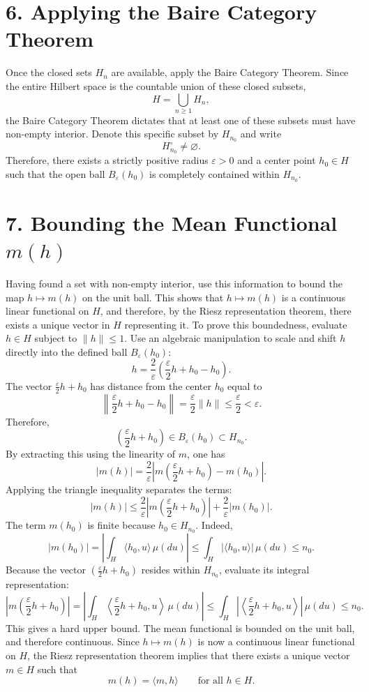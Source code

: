 \documentclass[11pt]{article}
\theoremstyle{definition}
\theoremstyle{remark}
\begin{document}
\section*{6. Applying the Baire Category Theorem}
Once the closed sets $H_n$ are available, apply the Baire Category Theorem. Since the entire Hilbert space is the countable union of these closed subsets,
\[
H=\bigcup_{n\ge 1} H_n,
\]
the Baire Category Theorem dictates that at least one of these subsets must have non-empty interior. Denote this specific subset by $H_{n_0}$ and write
\[
H^\circ_{n_0}\neq\varnothing.
\]
Therefore, there exists a strictly positive radius $\varepsilon>0$ and a center point $h_0\in H$ such that the open ball $B_\varepsilon(h_0)$ is completely contained within $H_{n_0}$.

\section*{7. Bounding the Mean Functional $m(h)$}
Having found a set with non-empty interior, use this information to bound the map $h\mapsto m(h)$ on the unit ball. This shows that $h\mapsto m(h)$ is a continuous linear functional on $H$, and therefore, by the Riesz representation theorem, there exists a unique vector in $H$ representing it. To prove this boundedness, evaluate $h\in H$ subject to $\|h\|\le 1$. Use an algebraic manipulation to scale and shift $h$ directly into the defined ball $B_\varepsilon(h_0)$:
\[
h=\frac{2}{\varepsilon}\left(\frac{\varepsilon}{2}h+h_0-h_0\right).
\]
The vector \(\frac{\varepsilon}{2}h+h_0\) has distance from the center \(h_0\) equal to
\[
\left\|\frac{\varepsilon}{2}h+h_0-h_0\right\|=\frac{\varepsilon}{2}\|h\|\le \frac{\varepsilon}{2}<\varepsilon.
\]
Therefore,
\[
\left(\frac{\varepsilon}{2}h+h_0\right)\in B_\varepsilon(h_0)\subset H_{n_0}.
\]
By extracting this using the linearity of $m$, one has
\[
|m(h)|=\frac{2}{\varepsilon}\left|m\left(\frac{\varepsilon}{2}h+h_0\right)-m(h_0)\right|.
\]
Applying the triangle inequality separates the terms:
\[
|m(h)|\le \frac{2}{\varepsilon}\left|m\left(\frac{\varepsilon}{2}h+h_0\right)\right|+\frac{2}{\varepsilon}|m(h_0)|.
\]
The term \(m(h_0)\) is finite because \(h_0\in H_{n_0}\). Indeed,
\[
|m(h_0)|
=
\left|\int_H \langle h_0,u\rangle\,\mu(du)\right|
\le
\int_H |\langle h_0,u\rangle|\,\mu(du)
\le n_0.
\]
Because the vector \(\left(\frac{\varepsilon}{2}h+h_0\right)\) resides within $H_{n_0}$, evaluate its integral representation:
\[
\left|m\left(\frac{\varepsilon}{2}h+h_0\right)\right|
=
\left|\int_H \left\langle \frac{\varepsilon}{2}h+h_0,u\right\rangle\,\mu(du)\right|
\le
\int_H \left|\left\langle \frac{\varepsilon}{2}h+h_0,u\right\rangle\right|\,\mu(du)
\le n_0.
\]
This gives a hard upper bound. The mean functional is bounded on the unit ball, and therefore continuous.
Since \(h\mapsto m(h)\) is now a continuous linear functional on \(H\), the Riesz representation theorem implies that there exists a unique vector \(m\in H\) such that
\[
m(h)=\langle m,h\rangle
\qquad \text{for all } h\in H.
\]
\end{document}
